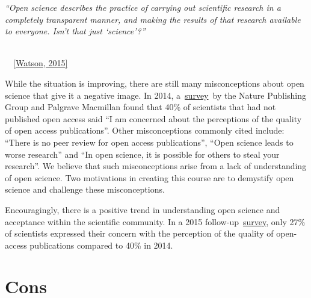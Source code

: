\documentclass[
]{book}
\begin{document}
\emph{``Open science describes the practice of carrying out scientific research in a completely transparent manner, and making the results of that research available to everyone. Isn't that just `science'?''}~ ~ ~ ~

~ ~ ~ ~ ~ ~ ~ ~ ~ ~ ~ ~ ~ ~ ~ ~ ~ ~ ~ ~ ~ ~ ~ ~ ~ ~ ~ ~ ~ ~ ~ ~ ~ ~ ~ ~ ~ ~ ~ ~ ~ ~~\href{https://genomebiology.biomedcentral.com/articles/10.1186/s13059-015-0669-2}{{[}}\href{https://genomebiology.biomedcentral.com/articles/10.1186/s13059-015-0669-2}{Watson, 2015}\href{https://genomebiology.biomedcentral.com/articles/10.1186/s13059-015-0669-2}{{]}}~

While the situation is improving, there are still many misconceptions about open science that give it a negative image. In 2014, a~\href{https://group.springernature.com/gp/group/media/press-releases/archive-2015/perceptions-of-open-access-publishing-are-changing-for-the-bette/12000378}{}\href{https://group.springernature.com/gp/group/media/press-releases/archive-2015/perceptions-of-open-access-publishing-are-changing-for-the-bette/12000378}{survey}~by the Nature Publishing Group and Palgrave Macmillan found that 40\% of scientists that had not published open access said ``I am concerned about the perceptions of the quality of open access publications''. Other misconceptions commonly cited include: ``There is no peer review for open access publications'', ``Open science leads to worse research'' and ``In open science, it is possible for others to steal your research''. We believe that such misconceptions arise from a lack of understanding of open science. Two motivations in creating this course are to demystify open science and challenge these misconceptions.

Encouragingly, there is a positive trend in understanding open science and acceptance within the scientific community. In a 2015 follow-up~\href{https://group.springernature.com/gp/group/media/press-releases/archive-2015/perceptions-of-open-access-publishing-are-changing-for-the-bette/12000378}{}\href{https://group.springernature.com/gp/group/media/press-releases/archive-2015/perceptions-of-open-access-publishing-are-changing-for-the-bette/12000378}{survey}, only 27\% of scientists expressed their concern with the perception of the quality of open-access publications compared to 40\% in 2014.

\hypertarget{cons}{%
\section{\texorpdfstring{\textbf{Cons}}{Cons}}\label{cons}}
\end{document}
